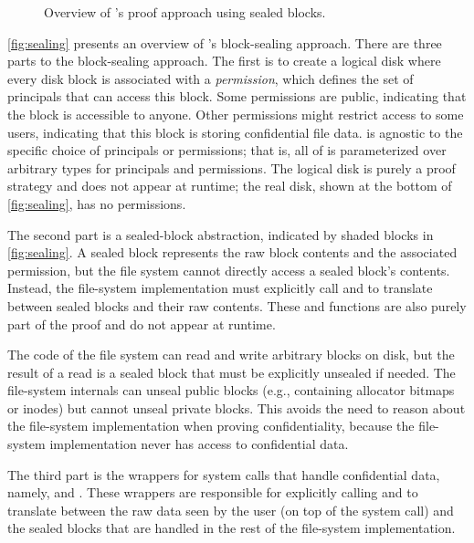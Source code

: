 \begin{figure}[ht]
  \centering
  \scalebox{0.8}{
    
  }
  \caption{Overview of \sys's proof approach using sealed blocks.}
  \label{fig:sealing}
\end{figure}

\autoref{fig:sealing} presents an overview of \sys's block-sealing
approach.  There are three parts to the block-sealing approach.  The first
is to create a logical disk where every disk block is associated with a
\emph{permission}, which defines the set of principals that can access
this block.  Some permissions are public, indicating that the block is
accessible to anyone.  Other permissions might restrict access to some
users, indicating that this block is storing confidential file data.
\sys is agnostic to the specific choice of principals or permissions;
that is, all of \sys is parameterized over arbitrary types for
principals and permissions.  The logical disk is purely a proof strategy
and does not appear at runtime; the real disk, shown at the bottom of
\autoref{fig:sealing}, has no permissions.

The second part is a sealed-block abstraction, indicated by shaded
blocks in \autoref{fig:sealing}.  A sealed block represents the raw
block contents and the associated permission, but the file system cannot
directly access a sealed block's contents.  Instead, the file-system
implementation must explicitly call  and  to
translate between sealed blocks and their raw contents.  These 
and  functions are also purely part of the proof and do
not appear at runtime.

The code of the file system can read and write arbitrary blocks on
disk, but the result of a read is a sealed block that must be explicitly unsealed
if needed.  The file-system internals can unseal public blocks (e.g.,
containing allocator bitmaps or inodes) but cannot unseal private blocks.
This avoids the need to reason about the file-system implementation when
proving confidentiality, because the file-system implementation never
has access to confidential data.

The third part is the wrappers for system calls that handle confidential
data, namely,  and .  These wrappers are responsible
for explicitly calling  and  to translate between
the raw data seen by the user (on top of the system call) and the sealed
blocks that are handled in the rest of the file-system implementation.

